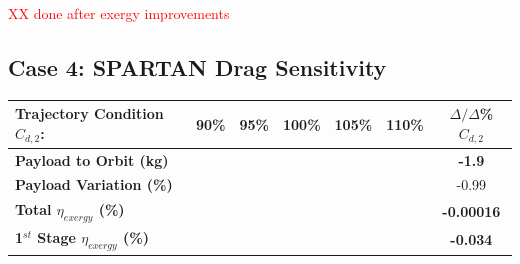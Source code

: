 \textcolor{red}{XX done after exergy improvements}


\subsection{Case 4: SPARTAN Drag Sensitivity}\label{sec:dragvariation}

\begin{table}[ht!]
	\centering
	\begin{tabular}{l c c c c c c} 
		\hline \textbf{Trajectory Condition}   \qquad  $C_{d,2}$: 
		&90\%
		&95\%
		&100\%
		&105\%
		&110\%
		& $\Delta/\Delta$\%$C_{d,2}$
		\\
		\hline \textbf{Payload to Orbit (kg)}
		& \textbf{\PayloadToOrbitCdNinetyNoReturn}
		& \textbf{\PayloadToOrbitCdNinetyFiveNoReturn}
		& \textbf{\PayloadToOrbitCdStandardNoReturn}
		& \textbf{\PayloadToOrbitCdOneHundredFiveNoReturn}
		& \textbf{\PayloadToOrbitCdOneHundredTenNoReturn}
		&\textbf{-1.9}
		\\
		\textbf{Payload Variation (\%)}
		& \PayloadVarCdNinetyNoReturn
		& \PayloadVarCdNinetyFiveNoReturn
		& \PayloadVarCdStandardNoReturn
		& \PayloadVarCdOneHundredFiveNoReturn
		& \PayloadVarCdOneHundredTenNoReturn
		&-0.99
		\\
		\textbf{Total $\eta_{exergy}$ (\%)}
		& \textbf{\totalExergyEffCdNinetyNoReturn}
		& \textbf{\totalExergyEffCdNinetyFiveNoReturn}
		& \textbf{\totalExergyEffCdStandardNoReturn}
		& \textbf{\totalExergyEffCdOneHundredFiveNoReturn}
		& \textbf{\totalExergyEffCdOneHundredTenNoReturn}
		& \textbf{-0.00016}
		\\
		\hline 
		\textbf{1$^{st}$ Stage $\eta_{exergy}$ (\%)}
		& \textbf{\firstExergyEffCdNinetyNoReturn}
		& \textbf{\firstExergyEffCdNinetyFiveNoReturn}
		& \textbf{\firstExergyEffCdStandardNoReturn}
		& \textbf{\firstExergyEffCdOneHundredFiveNoReturn}
		& \textbf{\firstExergyEffCdOneHundredTenNoReturn}
		& \textbf{-0.034}
		\\
	

\end{tabular}
\end{table}

